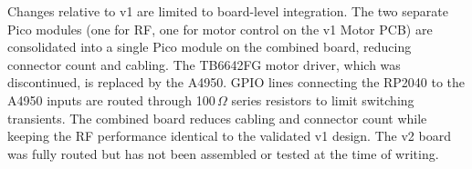 Changes relative to v1 are limited to board-level integration. The two separate Pico modules (one for RF, one for motor control on the v1 Motor PCB) are consolidated into a single Pico module on the combined board, reducing connector count and cabling. The TB6642FG motor driver, which was discontinued, is replaced by the A4950. GPIO lines connecting the RP2040 to the A4950 inputs are routed through 100\,$\Omega$ series resistors to limit switching transients. The combined board reduces cabling and connector count while keeping the RF performance identical to the validated v1 design. The v2 board was fully routed but has not been assembled or tested at the time of writing.
